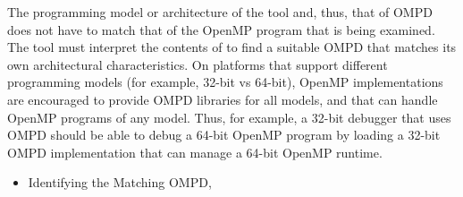 The programming model or architecture of the tool and, thus, that of OMPD does 
not have to match that of the OpenMP program that is being examined. The tool
must interpret the contents of  to find a suitable OMPD 
that matches its own architectural characteristics. On platforms that support 
different programming models (for example, 32-bit vs 64-bit), OpenMP 
implementations are encouraged to provide OMPD libraries for all models, and 
that can handle OpenMP programs of any model. Thus, for example, a 32-bit 
debugger that uses OMPD should be able to debug a 64-bit OpenMP program by 
loading a 32-bit OMPD implementation that can manage a 64-bit OpenMP runtime.

\crossreferences
\begin{itemize}
	\item Identifying the Matching OMPD, 
\end{itemize}



